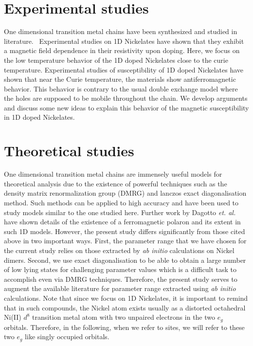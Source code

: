 \documentclass[12pt,twoside]{report}
\begin{document}
	\section*{Experimental studies}
	
	One dimensional transition metal chains have been synthesized and studied in
	literature.~\cite{darriet_compound_1993,batlogg_haldane_1994} Experimental
	studies on 1D Nickelates have shown that they exhibit a magnetic field
	dependence in their resistivity upon doping.\cite{xu_holes_2000} Here, we
	focus on the low temperature behavior of the 1D doped Nickelates close to
	the curie temperature. Experimental studies of susceptibility of 1D doped
	Nickelates have shown that near the Curie temperature, the materials show
	antiferromagnetic behavior.\cite{Ramirez} This behavior is contrary to the
	usual double exchange model where the holes are supposed to be mobile
	throughout the chain. We develop arguments and discuss some new ideas to
	explain this behavior of the magnetic susceptibility in 1D doped Nickelates.
	
	\section*{Theoretical studies}
	
	One dimensional transition metal chains are immensely useful models for
	theoretical analysis due to the existence of powerful techniques such as the
	density matrix renormalization group (DMRG) and lanczos exact
	diagonalisation method. Such methods can be applied to high accuracy and
	have been used to study models similar to the one studied
	here.\cite{dagotto_correlated_1994,patel_emergence_2020} Further work by
	Dagotto \textit{et. al.} have shown details of the existence of a
	ferromagnetic polaron and its extent in such 1D
	models.\cite{malvezzi_origin_2001} However, the present study differs
	significantly from those cited above in two important ways. First, the
	parameter range that we have chosen for the current study relies on those
	extracted by \textit{ab initio} calculations on Nickel
	dimers.\cite{bastardis_microscopic_2007,bastardis_isotropic_2008} Second, we
	use exact diagonalisation to be able to obtain a large number of low lying
	states for challenging parameter values which is a difficult task to
	accomplish even via DMRG techniques. Therefore, the present study serves to
	augment the available literature for parameter range extracted using
	\textit{ab initio} calculations. Note that since we focus on 1D Nickelates,
	it is important to remind that in such compounds, the Nickel atom exists
	usually as a distorted octahedral Ni(II) $d^8$ transition metal atom with
	two unpaired electrons in the two $e_g$ orbitals. Therefore, in the
	following, when we refer to sites, we will refer to these two $e_g$ like
	singly occupied orbitals.
	
\end{document}

